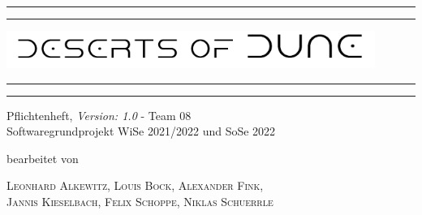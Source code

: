 \documentclass[12pt]{article}
\begin{document}

\begin{titlepage} %

	\centering %
	
	\scshape %
	
	\vspace*{\baselineskip} %
	
	
	\rule{\textwidth}{1.6pt}\vspace*{-\baselineskip}\vspace*{2pt} %
	\rule{\textwidth}{0.4pt} %
	
	\vspace{0.75\baselineskip} %
	
	\includegraphics[width=0.9\textwidth]{images/Titelblatt}
	
	
	\rule{\textwidth}{0.4pt}\vspace*{-\baselineskip}\vspace{3.2pt} %
	\rule{\textwidth}{1.6pt} %
	
	\vspace{2\baselineskip} %
	
	
	Pflichtenheft, \textit{Version: 1.0} - Team 08 \\ 
	Softwaregrundprojekt WiSe 2021/2022 und SoSe 2022
	
	\vspace*{15\baselineskip} %
	
	
	bearbeitet von
	
	\vspace{0.5\baselineskip} %
	
	{\scshape Leonhard Alkewitz, Louis Bock, Alexander Fink, \\ Jannis Kieselbach, Felix Schoppe, Niklas Schuerrle\\} %
	
	\vspace{0.5\baselineskip} %
	
	\vfill %
	

\end{titlepage}
\end{document}
